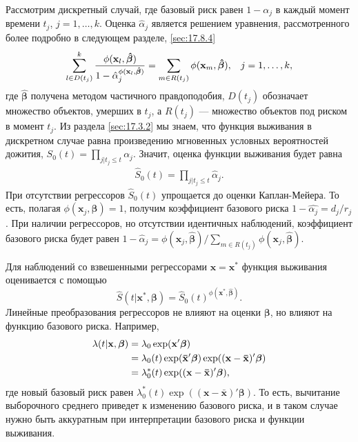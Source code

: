 Рассмотрим дискретный случай, где базовый риск равен $1-\alpha_j$ в каждый момент времени $t_j$, $j=1, \ldots ,k$. Оценка $\hat{\alpha}_j$ является решением уравнения, рассмотренного более подробно в следующем разделе, \ref{sec:17.8.4}
        \begin{align}
        \label{eq:17.36}
        \sum^{k}_{l\in D(t_j)}\frac{\phi(\mathbf{x}_l,\bm{\hat{\beta}})}{1-\hat{\alpha}_j^{\phi(\mathbf{x}_l,\bm{\hat{\beta}})}}=\sum_{m\in R(t_j)}\phi(\mathbf{x}_m,\bm{\hat{\beta}}),\hspace{0.3cm}j=1, \ldots ,k,
        \end{align}
где $\bm{\hat{\beta}}$ получена методом частичного правдоподобия, $D(t_j)$ обозначает множество объектов, умерших в $t_j$, а $R(t_j)$ --- множество объектов под риском в момент $t_j$. Из раздела \ref{sec:17.3.2} %
мы знаем, что функция выживания в дискретном случае равна произведению мгновенных условных вероятностей дожития, $S_0(t)=\prod_{j|t_j\le t}\alpha_j$. Значит, оценка функции выживания будет равна
        \begin{align}
        \label{eq:17.37}
        \hat{S}_0(t)=\prod_{j|t_j\le t}\hat{\alpha}_j.
        \end{align}
При отсутствии регрессоров $\hat{S}_0(t)$ упрощается до оценки Каплан-Мейера. То есть, полагая $\phi(\mathbf{x}_j,\bm{\beta})=1$, получим коэффициент базового риска $1-\hat{\alpha_j}=d_j/r_j$. При наличии регрессоров, но отсутствии идентичных наблюдений, коэффициент базового риска будет равен $1-\hat{\alpha}_j=\phi(\mathbf{x}_j,\bm{\hat{\beta}})/\sum_{m\in R(t_j)}\phi(\mathbf{x}_j,\bm{\hat{\beta}})$.

Для наблюдений со взвешенными регрессорами $\mathbf{x}=\mathbf{x}^*$ функция выживания оценивается с помощью
        $$\hat{S}(t|\mathbf{x}^*,\bm{\beta})=\hat{S}_0(t)^{\phi(\mathbf{x}^*,\hat{\bm{\beta}})}.$$
Линейные преобразования регрессоров не влияют на оценки $\bm{\beta}$, но влияют на функцию базового риска. Например,
        \begin{align}
        \lambda(t|\mathbf{x},\bm{\beta})&=\lambda_0\exp(\mathbf{x}'\bm{\beta})\notag\\
        &=\lambda_0(t)\exp(\mathbf{\bar{x}}'\bm{\beta})\exp((\mathbf{x}-\mathbf{\bar{x}})'\bm{\beta})\notag\\
        &=\lambda^*_0(t)\exp((\mathbf{x}-\mathbf{\bar{x}})'\bm{\beta}),\notag
        \end{align}
где новый базовый риск равен $\lambda^*_0(t)\exp((\mathbf{x}-\mathbf{\bar{x}})'\bm{\beta})$. %
То есть, вычитание выборочного среднего приведет к изменению базового риска, и в таком случае нужно быть аккуратным при интерпретации базового риска и функции выживания.

